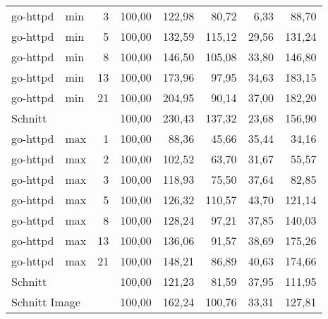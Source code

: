 \begin{footnotesize}
\begin{longtable}{llrrrrrr}
		go-httpd       & min     & 3          & 100,00 & 122,98                      & 80,72                          & 6,33   & 88,70  \\
		go-httpd       & min     & 5          & 100,00 & 132,59                      & 115,12                         & 29,56  & 131,24 \\
		go-httpd       & min     & 8          & 100,00 & 146,50                      & 105,08                         & 33,80  & 146,80 \\
		go-httpd       & min     & 13         & 100,00 & 173,96                      & 97,95                          & 34,63  & 183,15 \\
		go-httpd       & min     & 21         & 100,00 & 204,95                      & 90,14                          & 37,00     & 182,20 \\ \hline
		Schnitt        &         &            & 100,00 & 230,43                      & 137,32                         & 23,68  & 156,90 \\ \hline
		go-httpd       & max     & 1          & 100,00 & 88,36                       & 45,66                          & 35,44  & 34,16  \\
		go-httpd       & max     & 2          & 100,00 & 102,52                      & 63,70                          & 31,67  & 55,57  \\
		go-httpd       & max     & 3          & 100,00 & 118,93                      & 75,50                          & 37,64  & 82,85  \\
		go-httpd       & max     & 5          & 100,00 & 126,32                      & 110,57                         & 43,70  & 121,14 \\
		go-httpd       & max     & 8          & 100,00 & 128,24                      & 97,21                          & 37,85  & 140,03 \\
		go-httpd       & max     & 13         & 100,00 & 136,06                      & 91,57                          & 38,69  & 175,26 \\
		go-httpd       & max     & 21         & 100,00 & 148,21                      & 86,89                          & 40,63  & 174,66 \\ \hline
		Schnitt        &         &            & 100,00 & 121,23                      & 81,59                          & 37,95  & 111,95 \\ \hline
		\multicolumn{2}{l}{Schnitt Image} &            & 100,00 & 162,24                      & 100,76                         & 33,31  & 127,81 \\ \hline

\end{longtable}
\end{footnotesize}
